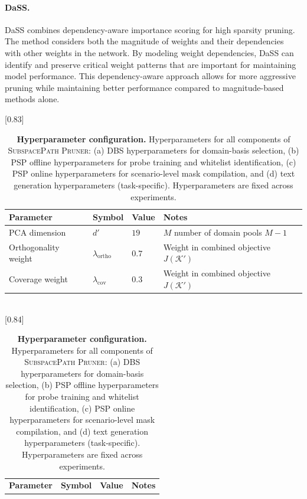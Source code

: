 \paragraph{DaSS.}
DaSS \cite{guo2024dass} combines dependency-aware importance scoring for high sparsity pruning. The method considers both the magnitude of weights and their dependencies with other weights in the network. By modeling weight dependencies, DaSS can identify and preserve critical weight patterns that are important for maintaining model performance. This dependency-aware approach allows for more aggressive pruning while maintaining better performance compared to magnitude-based methods alone.

\begin{table}[!t]
\caption{\textbf{Hyperparameter configuration.}
Hyperparameters for all components of \textsc{SubspacePath Pruner}: (a) DBS hyperparameters for domain-basis selection, (b) PSP offline hyperparameters for probe training and whitelist identification, (c) PSP online hyperparameters for scenario-level mask compilation, and (d) text generation hyperparameters (task-specific). Hyperparameters are fixed across experiments.}
\centering
\small
\setlength{\tabcolsep}{8pt}
\renewcommand{\arraystretch}{1.06}
[0.83\textwidth]{
\begin{tabular}{>{\raggedright\arraybackslash}p{3.0cm}>{\centering\arraybackslash}p{1.8cm}>{\centering\arraybackslash}p{1.5cm}>{\raggedright\arraybackslash}p{5.0cm}}
\toprule
\textbf{Parameter} & \textbf{Symbol} & \textbf{Value} & \textbf{Notes} \\
\midrule
PCA dimension & $d'$ & $19$ & $M$ number of domain pools $M-1$  \\
Orthogonality weight & $\lambda_{\mathrm{ortho}}$ & $0.7$ & Weight in combined objective $J(\mathcal{K}')$ \\
Coverage weight & $\lambda_{\mathrm{cov}}$ & $0.3$ & Weight in combined objective $J(\mathcal{K}')$ \\
\bottomrule
\end{tabular}
} \\[0.5em]
[0.84\textwidth]{
\begin{tabular}{>{\raggedright\arraybackslash}p{3.5cm}>{\centering\arraybackslash}p{2.2cm}>{\centering\arraybackslash}p{2.0cm}>{\raggedright\arraybackslash}p{4.5cm}}
\toprule
\textbf{Parameter} & \textbf{Symbol} & \textbf{Value} & \textbf{Notes} \\

\end{tabular}}
\end{table}
